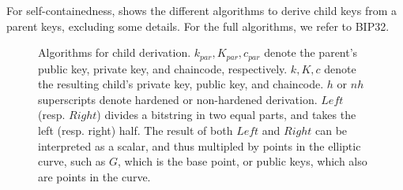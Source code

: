 For self-containedness,  shows the different
algorithms to derive child keys from a parent keys, excluding some details. For
the full algorithms, we refer to BIP32.

\begin{figure}[ht!]
  \begin{minipage}[t]{0.55\textwidth}
  \end{minipage}
  \caption{Algorithms for child derivation. $k_{par},K_{par},c_{par}$ denote the
    parent's public key, private key, and chaincode, respectively. $k,K,c$
    denote the resulting child's private key, public key, and chaincode. $h$ or
    $nh$ superscripts denote hardened or non-hardened derivation. $Left$
    (resp. $Right$) divides a bitstring in two equal parts, and takes the left
    (resp. right) half. The result of both $Left$ and $Right$ can be interpreted
    as a scalar, and thus multipled by points in the elliptic curve, such as $G$,
    which is the base point, or public keys, which also are points in the
    curve.}
  \label{fig:childderivation}
\end{figure}

